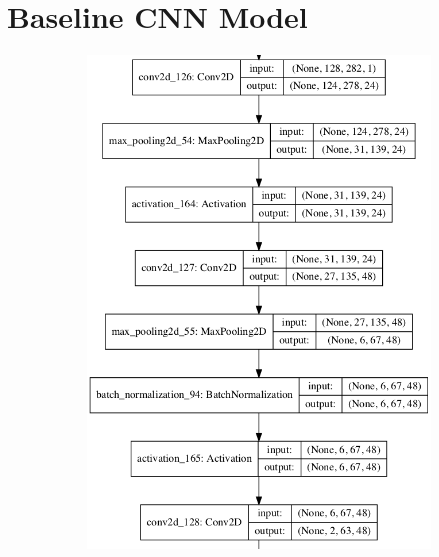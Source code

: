 
\renewcommand{\baselinestretch}{1.5}
\chapter{Baseline CNN Model}
\begin{figure}[htbp]
     \begin{subfigure}[b]{0.5\linewidth}
         \centering
		  \includegraphics[scale=0.35]{Figs/Appen/simple_model_plot.png}
     \end{subfigure}
     ~
     \begin{subfigure}[b]{0.5\linewidth}
         \centering

\end{subfigure}
\end{figure}
